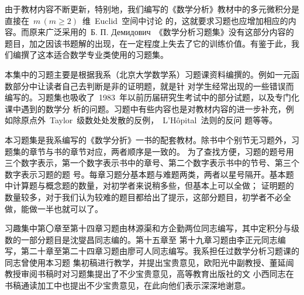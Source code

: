 
\begin{preface}

由于教材内容不断更新，特别地，我们编写的《数学分析》教材中的多元微积分是直接在~$m\,(m\geq2)$~维~Euclid~空间中讨论
的，这就要求习题也应增加相应的内容。而原来广泛采用的~Б. П. Демидович~《数学分析习题集》没有这部分内容的
题目，加之因该书题解的出现，在一定程度上失去了它的训练价值。有鉴于此，我们编撰了这本适合数学专业类使用的习题集。

本集中的习题主要是根据我系（北京大学数学系）习题课资料编撰的。例如一元函数部分中让读者自己去判断是非的证明题，就是针
对学生经常出现的一些错误而编写的。习题集也吸收了~1983~年以前历届研究生考试中的部分试题，以及专门化课中遇到的数学分
析的问题。习题中有些内容也是对教材内容的进一步补充，例如除原点外~Taylor~级数处处发散的反例，~L'H\^opital~法则的反问
题等等。

本习题集是我系编写的《数学分折》一书的配套教材。除书中个别节无习题外，习题集的章节与书的章节对应，两者顺序是一致的。%
为了查找方便，习题的题号用三个数字表示，第一个数字表示书中的章号、第二个数字表示书中的节号、第三个数字表示习题的题
号。每章习题分基本题与难题两类，两者以星号隔开。基本题中计算题与概念题的数量，对初学者来说稍多些，但基本上可以全做；%
证明题的数量较多，对于我们认为较难的题目都给出了提示，这部分题目，初学者不必全做，能做一半也就可以了。

习趣集中第〇章至第十四章习题由林源渠和方企勤两位同志编写，其中定积分与级数的一部分题目是沈燮昌同志编的。第十五章至
第十九章习题由李正元同志编写，第二十章至第二十四章习题由廖可人同志编写。我系担任过数学分析习题课的同志曾使用本习题
集初稿进行教学，并提出宝贵意见，欧阳光中副教授、董延闿教授审阅书稿时对习题集提出了不少宝贵意见，高等教育出版社的文
小西同志在书稿通读加工中也提出不少宝贵意见，在此向他们表示深深地谢意。

\end{preface}

\endinput
